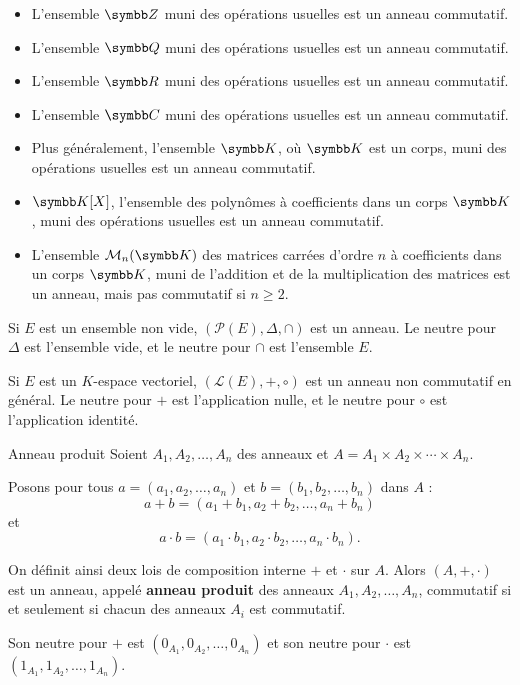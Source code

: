 \begin{exemple}
    \begin{itemize}
        \item L'ensemble $\Z$ muni des opérations usuelles est un anneau commutatif.
        \item L'ensemble $\Q$ muni des opérations usuelles est un anneau commutatif.
        \item L'ensemble $\R$ muni des opérations usuelles est un anneau commutatif.
        \item L'ensemble $\C$ muni des opérations usuelles est un anneau commutatif.
        \item Plus généralement, l'ensemble $\K$, où $\K$ est un corps, muni des opérations usuelles est un anneau commutatif.
        \item $\K[X]$, l'ensemble des polynômes à coefficients dans un corps $\K$, muni des opérations usuelles est un anneau commutatif.
        \item L'ensemble $\mathcal{M}_n(\K)$ des matrices carrées d'ordre $n$ à coefficients dans un corps $\K$, muni de l'addition et de la multiplication des matrices est un anneau, mais pas commutatif si $n \geq 2$.
    \end{itemize}

    Si $E$ est un ensemble non vide, $(\mathscr{P}(E), \Delta, \cap)$ est un anneau. Le neutre pour $\Delta$ est l'ensemble vide, 
    et le neutre pour $\cap$ est l'ensemble $E$.

    Si $E$ est un $K$-espace vectoriel, $(\mathscr{L}(E), +, \circ)$ est un anneau non commutatif en général. Le neutre pour $+$ est l'application nulle, et le neutre pour $\circ$ est l'application identité.
\end{exemple}


\begin{proposition}{Anneau produit}{}
    Soient $A_1, A_2, \ldots, A_n$ des anneaux et $A = A_1 \times A_2 \times \cdots \times A_n$.

    Posons pour tous $a = (a_1, a_2, \ldots, a_n)$ et $b = (b_1, b_2, \ldots, b_n)$ dans $A$ :
    \[
        a + b = (a_1 + b_1, a_2 + b_2, \ldots, a_n + b_n)
    \]
    et
    \[
        a \cdot b = (a_1 \cdot b_1, a_2 \cdot b_2, \ldots, a_n \cdot b_n).
    \]

    On définit ainsi deux lois de composition interne $+$ et $\cdot$ sur $A$.
    Alors $(A, +, \cdot)$ est un anneau, appelé \textbf{anneau produit} des anneaux $A_1, A_2, \ldots, A_n$, 
    commutatif si et seulement si chacun des anneaux $A_i$ est commutatif.

    Son neutre pour $+$ est $(0_{A_1}, 0_{A_2}, \ldots, 0_{A_n})$ et son neutre pour $\cdot$ est $(1_{A_1}, 1_{A_2}, \ldots, 1_{A_n})$.
\end{proposition}

